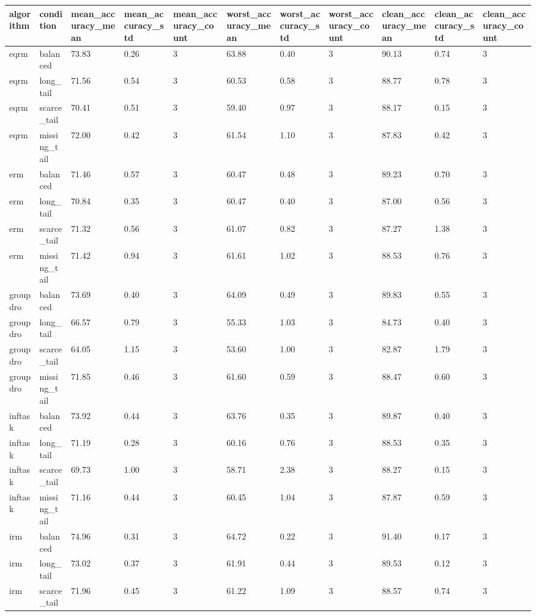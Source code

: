 \begin{tabular}{lllllllllll}
\toprule
algorithm & condition & mean\_accuracy\_mean & mean\_accuracy\_std & mean\_accuracy\_count & worst\_accuracy\_mean & worst\_accuracy\_std & worst\_accuracy\_count & clean\_accuracy\_mean & clean\_accuracy\_std & clean\_accuracy\_count \\
\midrule
eqrm & balanced & 73.83 & 0.26 & 3 & 63.88 & 0.40 & 3 & 90.13 & 0.74 & 3 \\
eqrm & long\_tail & 71.56 & 0.54 & 3 & 60.53 & 0.58 & 3 & 88.77 & 0.78 & 3 \\
eqrm & scarce\_tail & 70.41 & 0.51 & 3 & 59.40 & 0.97 & 3 & 88.17 & 0.15 & 3 \\
eqrm & missing\_tail & 72.00 & 0.42 & 3 & 61.54 & 1.10 & 3 & 87.83 & 0.42 & 3 \\
erm & balanced & 71.46 & 0.57 & 3 & 60.47 & 0.48 & 3 & 89.23 & 0.70 & 3 \\
erm & long\_tail & 70.84 & 0.35 & 3 & 60.47 & 0.40 & 3 & 87.00 & 0.56 & 3 \\
erm & scarce\_tail & 71.32 & 0.56 & 3 & 61.07 & 0.82 & 3 & 87.27 & 1.38 & 3 \\
erm & missing\_tail & 71.42 & 0.94 & 3 & 61.61 & 1.02 & 3 & 88.53 & 0.76 & 3 \\
groupdro & balanced & 73.69 & 0.40 & 3 & 64.09 & 0.49 & 3 & 89.83 & 0.55 & 3 \\
groupdro & long\_tail & 66.57 & 0.79 & 3 & 55.33 & 1.03 & 3 & 84.73 & 0.40 & 3 \\
groupdro & scarce\_tail & 64.05 & 1.15 & 3 & 53.60 & 1.00 & 3 & 82.87 & 1.79 & 3 \\
groupdro & missing\_tail & 71.85 & 0.46 & 3 & 61.60 & 0.59 & 3 & 88.47 & 0.60 & 3 \\
inftask & balanced & 73.92 & 0.44 & 3 & 63.76 & 0.35 & 3 & 89.87 & 0.40 & 3 \\
inftask & long\_tail & 71.19 & 0.28 & 3 & 60.16 & 0.76 & 3 & 88.53 & 0.35 & 3 \\
inftask & scarce\_tail & 69.73 & 1.00 & 3 & 58.71 & 2.38 & 3 & 88.27 & 0.15 & 3 \\
inftask & missing\_tail & 71.16 & 0.44 & 3 & 60.45 & 1.04 & 3 & 87.87 & 0.59 & 3 \\
irm & balanced & 74.96 & 0.31 & 3 & 64.72 & 0.22 & 3 & 91.40 & 0.17 & 3 \\
irm & long\_tail & 73.02 & 0.37 & 3 & 61.91 & 0.44 & 3 & 89.53 & 0.12 & 3 \\
irm & scarce\_tail & 71.96 & 0.45 & 3 & 61.22 & 1.09 & 3 & 88.57 & 0.74 & 3 \\

\end{tabular}
